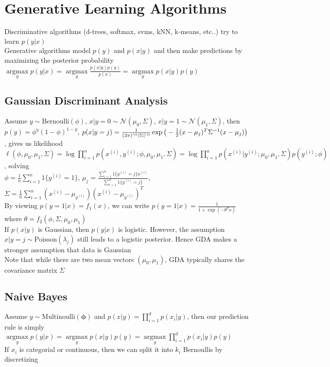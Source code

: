 \documentclass{article}
\DeclareMathOperator*{\argmax}{argmax}
\DeclarePairedDelimiter\abs{\lvert}{\rvert}
\begin{document}
\section{Generative Learning Algorithms}
Discriminative algorithms (d-trees, softmax, svms, kNN, k-means, etc..) try to learn $p(y|x)$ \\
Generative algorithms model $p(y)$ and $p(x|y)$ and then make predictions by maximizing the posterior probability $\argmax\limits_y p(y|x) = \argmax\limits_y \frac{p(x|y)p(y)}{p(x)} = \argmax\limits_y p(x|y)p(y)$ 

\subsection{Gaussian Discriminant Analysis}
Assume $y \sim \mbox{Bernoulli}(\phi)$, $x|y=0 \sim \mathcal{N}(\mu_0, \Sigma)$, $x|y=1 \sim \mathcal{N}(\mu_1, \Sigma)$, then \\
$p(y) = \phi^y (1-\phi)^{1-y}$, $p(x|y=j) = \frac{1}{ (2 \pi)^{\sfrac{d}{2}} \abs{\Sigma} ^{\sfrac{1}{2}}}\exp \big(-\frac{1}{2}(x-\mu_j)^T\Sigma^{-1}(x-\mu_j)\big)$, gives us likelihood \\
$\ell(\phi, \mu_0, \mu_1, \Sigma) = \log \prod\limits_{i=1}^np(x^{(i)}, y^{(i)}; \phi, \mu_0, \mu_1, \Sigma) = \log \prod\limits_{i=1}^np(x^{(i)} | y^{(i)}; \mu_0, \mu_1, \Sigma)p(y^{(i)}; \phi)$, solving \\
$\phi = \frac{1}{n}\sum\limits_{i=1}^n 1\{y^{(i)} = 1\}$, $\mu_j = \frac{\sum_{i=1}^n 1\{y^{(i)} = j\} x^{(i)}} {\sum_{i=1}^n 1\{y^{(i)} = j\}}$, $\Sigma = \frac{1}{n}\sum\limits_{i=1}^n (x^{(i)} - \mu_{y^{(i)}})(x^{(i)} - \mu_{y^{(i)}})^T$ \\
By viewing $p(y=1|x) = f_1(x)$, we can write $p(y=1|x) = \frac{1}{1+\exp(-\theta^Tx)}$ where $\theta = f_2(\phi, \Sigma, \mu_0, \mu_1)$ \\
If $p(x|y)$ is Gaussian, then $p(y|x)$ is logistic. However, the assumption  $x|y = j \sim \mbox{Poisson}(\lambda_j)$ still leads to a logistic posterior. Hence GDA makes a stronger assumption that data is Gaussian \\
Note that while there are two mean vectors $(\mu_0, \mu_1)$, GDA typically shares the covariance matrix $\Sigma$

\subsection{Naive Bayes}
Assume $y \sim \mbox{Multinoulli}(\boldsymbol \phi)$ and $p(x|y) = \prod\limits_{i=1}^d p(x_i | y)$, then our prediction rule is simply \\
$\argmax\limits_y p(y | x) = \argmax\limits_y p(x|y)p(y) = \argmax\limits_y \prod\limits_{i=1}^d p(x_i | y) p(y)$ \\
If $x_i$ is categorial or continuous, then we can split it into $k_i$ Bernoullis by discretizing
\end{document}

